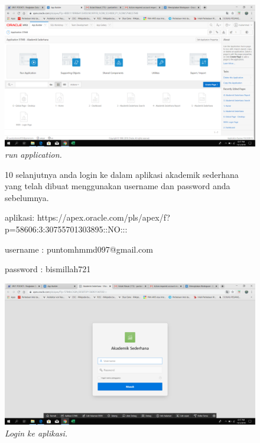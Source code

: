\begin{enumerate}
\begin{figure}
    \begin{center}
\includegraphics[scale=0.2]{figures/ss9.png}
    \caption{\textit{run application.}}
        \end{center}
\label{gambar}
\end{figure}

\begin{figure}
\item[10] selanjutnya anda login ke dalam aplikasi akademik sederhana yang telah dibuat menggunakan username dan password anda sebelumnya.


aplikasi: https://apex.oracle.com/pls/apex/f?p=58606:3:30755701303895::NO:::


username : puntomhmmd097@gmail.com


password : bismillah721

    \begin{center}
\includegraphics[scale=0.2]{figures/ss10.png}
    \caption{\textit{Login ke aplikasi.}}
        \end{center}
\label{gambar}
\end{figure}


\end{enumerate}
